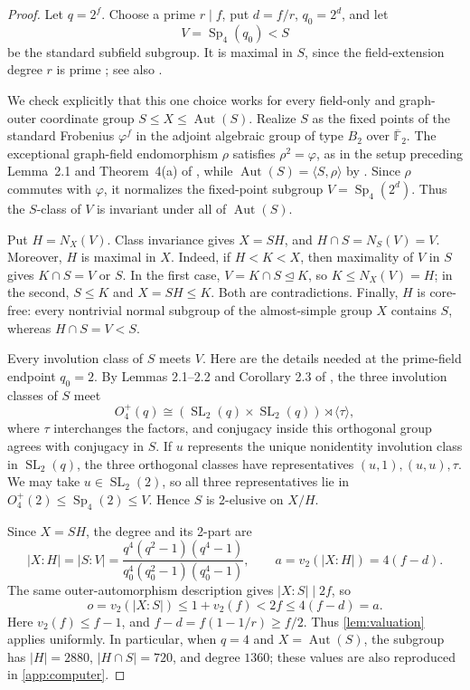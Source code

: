 \documentclass[11pt]{amsart}
\newcommand{\Aut}{\operatorname{Aut}}
\newcommand{\Sp}{\operatorname{Sp}}
\theoremstyle{definition}
\begin{document}
\begin{proof}
Let \(q=2^f\).  Choose a prime \(r\mid f\), put
\(d=f/r\), \(q_0=2^d\), and let
\[
V=\Sp_4(q_0)<S
\]
be the standard subfield subgroup.  It is maximal in \(S\), since the
field-extension degree \(r\) is prime
\cite[Table 8.14]{bhrd}; see also
\cite[Proposition 4.2 and Table 3]{burness-base}.

We check explicitly that this one choice works for every field-only and
graph-outer coordinate group \(S\leq X\leq\Aut(S)\).  Realize \(S\) as the
fixed points of the standard Frobenius \(\varphi^f\) in the adjoint algebraic
group of type \(B_2\) over \(\overline{\mathbb F}_2\).  The exceptional
graph-field endomorphism \(\rho\) satisfies \(\rho^2=\varphi\), as in the
setup preceding Lemma~2.1 and Theorem~4(a) of \cite{harper}, while
\(\Aut(S)=\langle S,\rho\rangle\) by \cite[Lemma 2.1]{harper}.  Since
\(\rho\) commutes with \(\varphi\), it
normalizes the fixed-point subgroup
\(V=\operatorname{Sp}_4(2^d)\).  Thus the \(S\)-class of \(V\) is invariant
under all of \(\Aut(S)\).

Put \(H=N_X(V)\).  Class invariance gives \(X=SH\), and
\(H\cap S=N_S(V)=V\).  Moreover, \(H\) is maximal in \(X\).  Indeed, if
\(H<K<X\), then maximality of \(V\) in \(S\) gives
\(K\cap S=V\) or \(S\).  In the first case, \(V=K\cap S\trianglelefteq K\),
so \(K\leq N_X(V)=H\); in the second, \(S\leq K\) and
\(X=SH\leq K\).  Both are contradictions.  Finally, \(H\) is core-free:
every nontrivial normal subgroup of the almost-simple group \(X\) contains
\(S\), whereas \(H\cap S=V<S\).

Every involution class of \(S\) meets \(V\).  Here are the details needed
at the prime-field endpoint \(q_0=2\).  By Lemmas 2.1--2.2 and Corollary 2.3
of \cite{lps-regular}, the three involution classes of \(S\) meet
\[
 O_4^+(q)\cong
 (\operatorname{SL}_2(q)\times\operatorname{SL}_2(q))
 \rtimes\langle\tau\rangle,
\]
where \(\tau\) interchanges the factors, and conjugacy inside this orthogonal
group agrees with conjugacy in \(S\).  If \(u\) represents the unique
nonidentity involution class in \(\operatorname{SL}_2(q)\), the three
orthogonal classes have representatives
\((u,1),(u,u),\tau\).  We may take
\(u\in\operatorname{SL}_2(2)\), so all three representatives lie in
\(O_4^+(2)\leq\operatorname{Sp}_4(2)\leq V\).  Hence \(S\) is
2-elusive on \(X/H\).

Since \(X=SH\), the degree and its 2-part are
\begin{equation}\label{eq:sp-degree}
 \lvert X:H\rvert=\lvert S:V\rvert
 =\frac{q^4(q^2-1)(q^4-1)}
 {q_0^4(q_0^2-1)(q_0^4-1)},\qquad
 a=v_2(\lvert X:H\rvert)=4(f-d).
\end{equation}
The same outer-automorphism description gives
\(\lvert X:S\rvert\mid2f\), so
\[
 o=v_2(\lvert X:S\rvert)\leq1+v_2(f)<2f\leq4(f-d)=a.
\]
Here \(v_2(f)\leq f-1\), and \(f-d=f(1-1/r)\geq f/2\).
Thus \cref{lem:valuation} applies uniformly.  In particular, when
\(q=4\) and \(X=\Aut(S)\), the subgroup has
\(\lvert H\rvert=2880\), \(\lvert H\cap S\rvert=720\), and degree \(1360\); these values are
also reproduced in \cref{app:computer}.
\end{proof}
\end{document}
